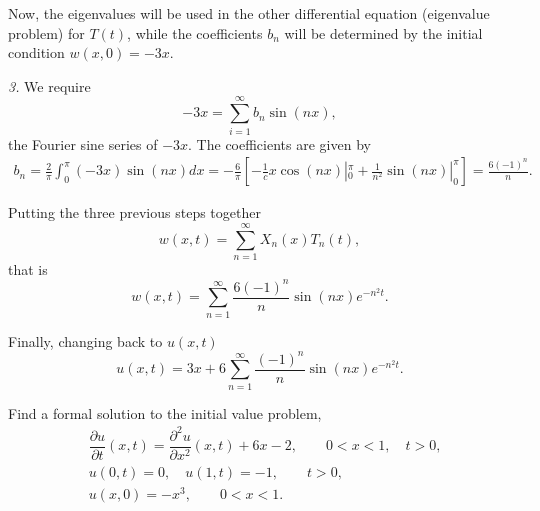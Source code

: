 \documentclass[11pt]{article}
\begin{document}
\begin{solution}
Now, the eigenvalues will be used in the other differential equation (eigenvalue problem) for $T(t)$, while the coefficients $b_{n}$ will be determined by the initial condition $w(x,0)=-3x$. 

\textsl{3.} We require
\[-3x=\sum_{i=1}^{\infty}b_{n}\sin(nx),\]
the Fourier sine series of $-3x$. The coefficients are given by
\begin{align*}
\boxed{b_{n}=\frac{2}{\pi}\int_{0}^{\pi}(-3x)\sin(nx)dx=-\frac{6}{\pi}\left[ -\frac{1}{c}x\cos(nx)|^{\pi}_{0} + \frac{1}{n^{2}}\sin(nx)|^{\pi}_{0} \right] = \frac{6(-1)^{n}}{n}}.
\end{align*}

Putting the three previous steps together 
\[w(x,t)=\sum_{n=1}^{\infty}X_{n}(x)T_{n}(t),\]
that is 
\[\boxed{w(x, t) =  \sum_{n=1}^{\infty}\frac{6(-1)^{n}}{n}\sin(nx)e^{-n^{2}t}}.\]

Finally, changing back to $u(x,t)$
\[\boxed{u(x, t) = 3x + 6 \sum_{n=1}^{\infty}\frac{(-1)^{n}}{n}\sin(nx)e^{-n^{2}t}}.\]
\end{solution}




\begin{problem}
Find a formal solution to the initial value problem,
\begin{equation*} \begin{split}
& \dfrac{\partial u }{\partial t } (x,t) = \dfrac{\partial^2 u}{\partial x^2}(x,t) + 6 x -2, \qquad 0<x<1, \quad t>0, \\
& u(0,t) = 0, \quad u(1,t)= -1, \qquad t>0, \\
& u(x,0) = -x^{3}, \qquad 0<x<1.
\end{split}\end{equation*}
\end{problem}
\end{document}
